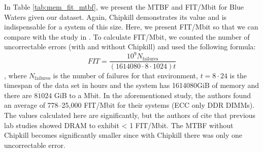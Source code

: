 In Table \ref{tab:mem_fit_mtbf}, we present the MTBF and FIT/Mbit for Blue
Waters given our dataset.  Again, Chipkill demonstrates its value and is
indispensable for a system of this size.   Here, we present FIT/Mbit so that
we can compare with the study in \cite{schroeder2009dram}.  To calculate
FIT/Mbit, we counted the number of uncorrectable errors (with and without
Chipkill) and used the following formula:
\begin{equation*}
  FIT = \frac{10^9N_{\textrm{failures}}}{(1614080\cdot8\cdot1024)t}
\end{equation*}
, where $N_{\textrm{failures}}$ is the number of failures for that environment,
$t=8\cdot24$ is the timespan of the data set in hours and the system has
1614080GiB of memory and there are $8\dot1024$ GiB to a Mbit. In the
aforementioned study, the authors found an average of 778--25,000 FIT/Mbit for
their systems (ECC only DDR DIMMs).  The values calculated here are
significantly, but the authors of \cite{schroeder2009dram} cite that previous
lab studies showed DRAM to exhibit < 1 FIT/Mbit.  The MTBF without Chipkill
becomes significantly smaller since with Chipkill there was only one
uncorrectable error.
